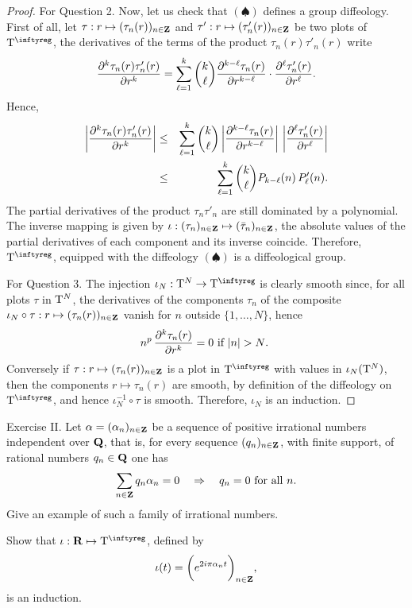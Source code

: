 \begin{proof}
  For Question 2. Now, let us check that $(\spadesuit)$ defines
  a group diffeology. First of all, let $\tau : r \mapsto (\tau_n(r))_{n\in\mathbf{Z}}$ and
  $\tau' : r \mapsto (\tau'_n(r))_{n\in\mathbf{Z}}$ be two plots of $\Torus^\infty$, the derivatives of the
  terms of the product $\tau_n(r)\tau'_n(r)$ write
  $$
    {\partial^k \tau_n(r)\tau'_n(r) \over \partial r^k} = \sum_{\ell = 1}^{k}
    {k \choose \ell}
    {\partial^{k-\ell} \tau_n(r) \over \partial r^{k-\ell}} \cdot
    {\partial^{\ell} \tau'_n(r) \over \partial r^{\ell}}.
    $$
  Hence,
  \begin{eqnarray*}
    \left|{\partial^k \tau_n(r)\tau'_n(r) \over \partial r^k} \right|
    & \leq & \sum_{\ell = 1}^{k} {k \choose \ell} \left|{\partial^{k-\ell} \tau_n(r) \over \partial r^{k-\ell}}\right| \,
    \left|{\partial^{\ell} \tau'_n(r) \over \partial r^{\ell}}\right| \\
    & \leq & \sum_{\ell = 1}^{k} {k \choose \ell} P_{k-\ell}(n) \, P'_\ell(n).
  \end{eqnarray*}
  The partial derivatives of the product $\tau_n \tau'_n$ are still dominated by a polynomial.
  The inverse mapping is given by $\iota : (\tau_n)_{n\in\mathbf{Z}} \mapsto (\bar \tau_n)_{n\in\mathbf{Z}}$,
  the absolute values of the partial derivatives of each component and its inverse coincide.
  Therefore,
  $\Torus^\infty$, equipped with the diffeology
  $(\spadesuit)$ is a diffeological group.
  
  For Question 3. The injection $\iota_N : \Torus^N \to \Torus^\infty$ is clearly smooth since,
  for all plots $\tau$ in $\mathrm{T}^N$,
  the derivatives of the components $\tau_n$ of the composite $\iota_N \circ \tau : r \mapsto (\tau_n(r))_{n\in\mathbf{Z}}$ vanish for $n$ outside $\{1,\ldots,N\}$,
  hence
  $$
    n^p\,{\partial^k \tau_n(r) \over \partial r^k} = 0 \ \text{if $\vert n \vert > N$.}\ 
    $$
  Conversely if $\tau : r \mapsto (\tau_n(r))_{n\in\mathbf{Z}}$ is a plot in $\Torus^\infty$ with values in $\iota_N(\mathrm{T}^N)$,
  then the components $r \mapsto \tau_n(r)$ are smooth,
  by definition of the diffeology on $\Torus^\infty$,
  and hence $\iota_N^{-1}\circ \tau$ is smooth.
  Therefore,
  $\iota_N$ is an induction.
\end{proof}


\begin{Article}{Exercise II.}{}
  Let $\alpha = (\alpha_n)_{n\in\mathbf{Z}}$ be a sequence of positive irrational numbers independent over $\mathbf{Q}$, that is,
  for every sequence $(q_n)_{n\in\mathbf{Z}}$, with finite support, of rational numbers $q_n \in \mathbf{Q}$ one has
  $$
    \sum_{n\in\mathbf{Z}} q_n \alpha_n = 0 \quad \Rightarrow \quad q_n = 0 \ \text{for all}\  n.
    $$
   Give an example of such a family of irrational numbers.
  
   Show that $\iota : \RR \mapsto \Torus^\infty$, defined by
  $$
    \iota(t) = \bigg(e^{2i\pi\alpha_n t}\bigg)_{n\in \mathbf{Z}},
    $$
  is an induction.
\end{Article}

